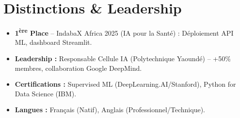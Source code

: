 \documentclass[a4paper,11pt]{article}
\begin{document}
\section{Distinctions \& Leadership}
\begin{itemize}[leftmargin=*, nosep]
    \item \textbf{1\textsuperscript{ère} Place} -- IndabaX Africa 2025 (IA pour la Santé) : Déploiement API ML, dashboard Streamlit.
    \item \textbf{Leadership :} Responsable Cellule IA (Polytechnique Yaoundé) -- +50\% membres, collaboration Google DeepMind.
    \item \textbf{Certifications :} Supervised ML (DeepLearning.AI/Stanford), Python for Data Science (IBM).
    \item \textbf{Langues :} Français (Natif), Anglais (Professionnel/Technique).
\end{itemize}
\end{document}

